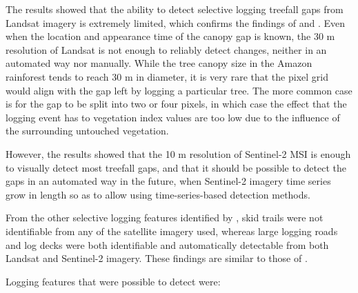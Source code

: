 \documentclass[a4paper,12pt]{scrbook}
\begin{document}

The results showed that the ability to detect selective logging treefall gaps from Landsat imagery is extremely limited, which confirms the findings of \citet{asner_remote_2002} and \citet{asner_canopy_2004}. Even when the location and appearance time of the canopy gap is known, the 30 m resolution of Landsat is not enough to reliably detect changes, neither in an automated way nor manually. While the tree canopy size in the Amazon rainforest tends to reach 30 m in diameter, it is very rare that the pixel grid would align with the gap left by logging a particular tree. The more common case is for the gap to be split into two or four pixels, in which case the effect that the logging event has to vegetation index values are too low due to the influence of the surrounding untouched vegetation.

However, the results showed that the 10 m resolution of Sentinel-2 \ac{MSI} is enough to visually detect most treefall gaps, and that it should be possible to detect the gaps in an automated way in the future, when Sentinel-2 imagery time series grow in length so as to allow using time-series-based detection methods.

From the other selective logging features identified by \citet{asner_remote_2002}, skid trails were not identifiable from any of the satellite imagery used, whereas large logging roads and log decks were both identifiable and automatically detectable from both Landsat and Sentinel-2 imagery. These findings are similar to those of \citet{read_spatial_2003}.

Logging features that were possible to detect were:
\end{document}
